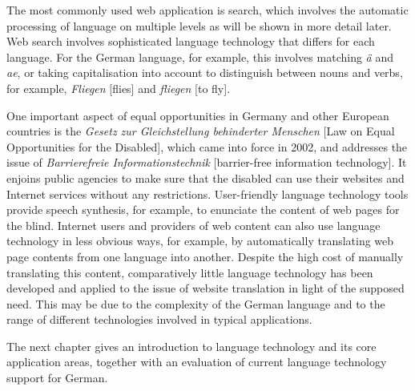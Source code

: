 \documentclass[]{../../metanetpaper}
\begin{document}
\begin{multicols}{2}
The most commonly used web application is search, which involves the automatic processing of language on multiple levels as will be shown in more detail later. Web search involves sophisticated language technology that differs for each language. For the German language, for example, this involves matching \textit{ä} and \textit{ae}, or taking capitalisation into account to distinguish between nouns and verbs, for example, \textit{Fliegen} [flies] and \textit{fliegen} [to fly]. 

One important aspect of equal opportunities in Germany and other European countries is the \textit{Gesetz zur Gleichstellung behinderter Menschen} [Law on Equal Opportunities for the Disabled], which came into force in 2002, and addresses the issue of \textit{Barrierefreie Informationstechnik} [barrier-free information technology]. It enjoins public agencies to make sure that the disabled can use their websites and Internet services without any restrictions. User-friendly language technology tools provide speech synthesis, for example, to enunciate the content of web pages for the blind. Internet users and providers of web content can also use language technology in less obvious ways, for example, by automatically translating web page contents from one language into another. Despite the high cost of manually translating this content, comparatively little language technology has been developed and applied to the issue of website translation in light of the supposed need. This may be due to the complexity of the German language and to the range of different technologies involved in typical applications.

The next chapter gives an introduction to language technology and its core application areas, together with an evaluation of current language technology support for German.
\end{multicols}

\clearpage

\end{document}
